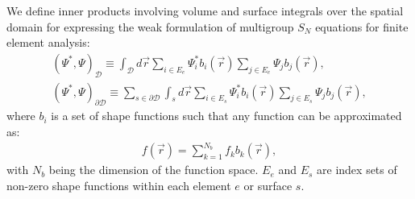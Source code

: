 \documentclass[letterpaper]{mc2025}
\begin{document}
%
We define inner products involving volume and surface integrals over the spatial domain for
expressing the weak formulation of multigroup $S_N$ equations for finite element analysis:
%
\begin{gather}
  \left(\Psi^*, \Psi\right)_\mathcal{D} \equiv \int_\mathcal{D}d\vec{r}
  \sum_{i\in E_e}\Psi^*_i b_i(\vec{r})\sum_{j\in E_e}\Psi_jb_j(\vec{r}), \\
  \left(\Psi^*, \Psi\right)_{\partial\mathcal{D}} \equiv
  \sum_{s\in\partial\mathcal{D}}\int_s d\vec{r}\sum_{i\in E_s}\Psi^*_i b_i(\vec{r})\sum_{j\in E_s}
  \Psi_j b_j(\vec{r}),
\end{gather}
%
where $b_i$ is a set of shape functions such that any function can be approximated as:
%
\begin{gather}
  f(\vec{r}) = \sum^{N_b}_{k=1}f_k b_k(\vec{r}),
\end{gather}
%
with $N_b$ being the dimension of the function space. $E_e$ and $E_s$ are index sets of non-zero
shape functions within each element $e$ or surface $s$.
\end{document}
